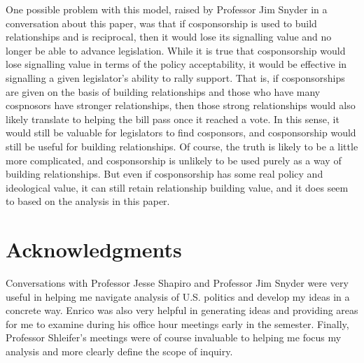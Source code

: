 \documentclass{article}
\begin{document}
  One possible problem with this model, raised by Professor Jim Snyder in a conversation about this paper, was that if cosponsorship is used to build relationships and is reciprocal, then it would lose its signalling value and no longer be able to advance legislation. While it is true that cosponsorship would lose signalling value in terms of the policy acceptability, it would be effective in signalling a given legislator's ability to rally support. That is, if cosponsorships are given on the basis of building relationships and those who have many cospnosors have stronger relationships, then those strong relationships would also likely translate to helping the bill pass once it reached a vote. In this sense, it would still be valuable for legislators to find cosponsors, and cosponsorship would still be useful for building relationships. Of course, the truth is likely to be a little more complicated, and cosponsorship is unlikely to be used purely as a way of building relationships. But even if cosponsorship has some real policy and ideological value, it can still retain relationship building value, and it does seem to based on the analysis in this paper.

  \section{Acknowledgments}
  Conversations with Professor Jesse Shapiro and Professor Jim Snyder were very useful in helping me navigate analysis of U.S. politics and develop my ideas in a concrete way. Enrico was also very helpful in generating ideas and providing areas for me to examine during his office hour meetings early in the semester. Finally, Professor Shleifer's meetings were of course invaluable to helping me focus my analysis and more clearly define the scope of inquiry. 

\pagebreak
\printbibliography
\end{document}
